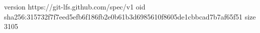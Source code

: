 version https://git-lfs.github.com/spec/v1
oid sha256:315732f7f7eed5efb6f186fb2e0b61b3d6985610f8605de1cbbcad7b7af65f51
size 3105
